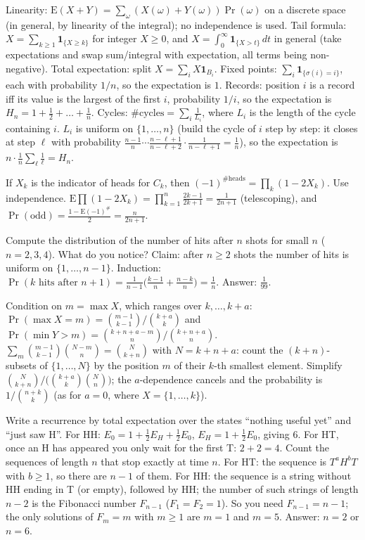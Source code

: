 \documentclass[11pt,a4paper]{article}
\begin{document}

 Linearity: $\mathrm{E}(X+Y)=\sum_\omega(X(\omega)+Y(\omega))\Pr(\omega)$ on a discrete space (in general, by linearity of the integral); no independence is used. Tail formula: $X=\sum_{k\ge1}\mathbf 1_{\{X\ge k\}}$ for integer $X\ge0$, and $X=\int_0^\infty\mathbf 1_{\{X>t\}}\,dt$ in general (take expectations and swap sum/integral with expectation, all terms being non-negative). Total expectation: split $X=\sum_iX\mathbf 1_{B_i}$.
 Fixed points: $\sum_i\mathbf 1_{\{\sigma(i)=i\}}$, each with probability $1/n$, so the expectation is $1$. Records: position $i$ is a record iff its value is the largest of the first $i$, probability $1/i$, so the expectation is $H_n=1+\frac12+\dots+\frac1n$.
 Cycles: $\#\text{cycles}=\sum_i\frac1{L_i}$, where $L_i$ is the length of the cycle containing $i$. $L_i$ is uniform on $\{1,\dots,n\}$ (build the cycle of $i$ step by step: it closes at step $\ell$ with probability $\frac{n-1}n\cdots\frac{n-\ell+1}{n-\ell+2}\cdot\frac1{n-\ell+1}=\frac1n$), so the expectation is $n\cdot\frac1n\sum_\ell\frac1\ell=H_n$.

 If $X_k$ is the indicator of heads for $C_k$, then $(-1)^{\#\text{heads}}=\prod_k(1-2X_k)$. Use independence.
 $\mathrm{E}\prod(1-2X_k)=\prod_{k=1}^n\frac{2k-1}{2k+1}=\frac1{2n+1}$ (telescoping), and $\Pr(\text{odd})=\frac{1-\mathrm{E}(-1)^{\#}}2=\frac n{2n+1}$.

 Compute the distribution of the number of hits after $n$ shots for small $n$ ($n=2,3,4$). What do you notice?
 Claim: after $n\ge2$ shots the number of hits is uniform on $\{1,\dots,n-1\}$. Induction: $\Pr(k\text{ hits after }n+1)=\frac1{n-1}\bigl(\frac{k-1}n+\frac{n-k}n\bigr)=\frac1n$.
 Answer: $\frac1{99}$.

 Condition on $m=\max X$, which ranges over $k,\dots,k+a$: $\Pr(\max X=m)=\binom{m-1}{k-1}\big/\binom{k+a}k$ and $\Pr(\min Y>m)=\binom{k+n+a-m}n\big/\binom{k+n+a}n$.
 $\sum_m\binom{m-1}{k-1}\binom{N-m}n=\binom N{k+n}$ with $N=k+n+a$: count the $(k+n)$-subsets of $\{1,\dots,N\}$ by the position $m$ of their $k$-th smallest element.
 Simplify $\binom N{k+n}\big/\bigl(\binom{k+a}k\binom Nn\bigr)$; the $a$-dependence cancels and the probability is $1\big/\binom{n+k}k$ (as for $a=0$, where $X=\{1,\dots,k\}$).

 Write a recurrence by total expectation over the states ``nothing useful yet'' and ``just saw H''. For HH: $E_0=1+\frac12E_H+\frac12E_0$, $E_H=1+\frac12E_0$, giving $6$. For HT, once an H has appeared you only wait for the first T: $2+2=4$.
 Count the sequences of length $n$ that stop exactly at time $n$. For HT: the sequence is $T^aH^bT$ with $b\ge1$, so there are $n-1$ of them.
 For HH: the sequence is a string without HH ending in T (or empty), followed by HH; the number of such strings of length $n-2$ is the Fibonacci number $F_{n-1}$ ($F_1=F_2=1$).
 So you need $F_{n-1}=n-1$; the only solutions of $F_m=m$ with $m\ge1$ are $m=1$ and $m=5$. Answer: $n=2$ or $n=6$.
\end{document}
